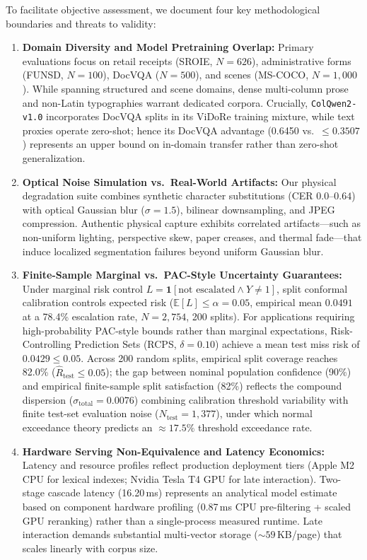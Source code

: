 To facilitate objective assessment, we document four key methodological boundaries and threats to validity:
\begin{enumerate}
    \setlength{\itemsep}{0pt}
    \setlength{\parskip}{0pt}
    \setlength{\parsep}{0pt}
    \setlength{\topsep}{1pt}
    \item \textbf{Domain Diversity and Model Pretraining Overlap:} Primary evaluations focus on retail receipts (SROIE, $N=626$), administrative forms (FUNSD, $N=100$), DocVQA ($N=500$), and scenes (MS-COCO, $N=1{,}000$). While spanning structured and scene domains, dense multi-column prose and non-Latin typographies warrant dedicated corpora. Crucially, \texttt{ColQwen2-v1.0} \cite{faysse2024colqwen2} incorporates DocVQA splits in its ViDoRe training mixture, while text proxies operate zero-shot; hence its DocVQA advantage (0.6450 vs.\ $\le 0.3507$) represents an upper bound on in-domain transfer rather than zero-shot generalization.
    \item \textbf{Optical Noise Simulation vs.\ Real-World Artifacts:} Our physical degradation suite combines synthetic character substitutions (CER $0.0$--$0.64$) with optical Gaussian blur ($\sigma=1.5$), bilinear downsampling, and JPEG compression. Authentic physical capture exhibits correlated artifacts---such as non-uniform lighting, perspective skew, paper creases, and thermal fade---that induce localized segmentation failures beyond uniform Gaussian blur.
    \item \textbf{Finite-Sample Marginal vs.\ PAC-Style Uncertainty Guarantees:} Under marginal risk control $L = \mathbf{1}[\text{not escalated} \land Y \ne 1]$, split conformal calibration controls expected risk ($\mathbb{E}[L] \le \alpha = 0.05$, empirical mean $0.0491$ at a 78.4\% escalation rate, $N=2{,}754$, 200 splits). For applications requiring high-probability PAC-style bounds rather than marginal expectations, Risk-Controlling Prediction Sets (RCPS, $\delta=0.10$) achieve a mean test miss risk of $0.0429 \le 0.05$. Across 200 random splits, empirical split coverage reaches 82.0\% ($\hat{R}_{\text{test}} \le 0.05$); the gap between nominal population confidence (90\%) and empirical finite-sample split satisfaction (82\%) reflects the compound dispersion ($\sigma_{\text{total}} = 0.0076$) combining calibration threshold variability with finite test-set evaluation noise ($N_{\text{test}}=1{,}377$), under which normal exceedance theory predicts an $\approx 17.5\%$ threshold exceedance rate.
    \item \textbf{Hardware Serving Non-Equivalence and Latency Economics:} Latency and resource profiles reflect production deployment tiers (Apple M2 CPU for lexical indexes; Nvidia Tesla T4 GPU for late interaction). Two-stage cascade latency (16.20\,ms) represents an analytical model estimate based on component hardware profiling (0.87\,ms CPU pre-filtering + scaled GPU reranking) rather than a single-process measured runtime. Late interaction demands substantial multi-vector storage ($\sim 59$\,KB/page) that scales linearly with corpus size.
\end{enumerate}

